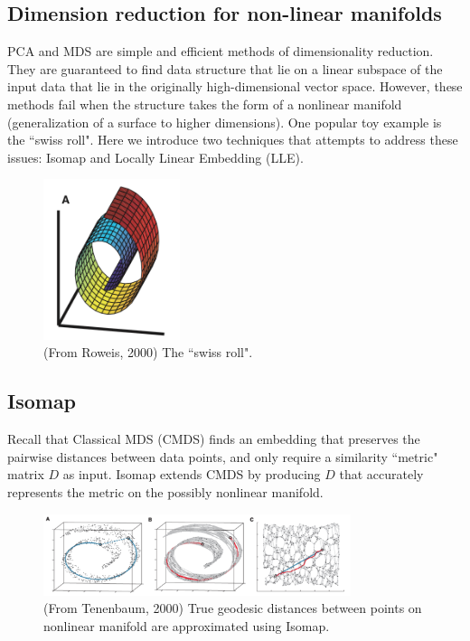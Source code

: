 \documentclass[11pt]{article}
\begin{document}
\begin{multicols}{2}
\section*{Dimension reduction for non-linear manifolds}
PCA and MDS are simple and efficient methods of dimensionality reduction. They are guaranteed to find data structure that lie on a linear subspace of the input data that lie in the originally high-dimensional vector space. However, these methods fail when the structure takes the form of a nonlinear manifold (generalization of a surface to higher dimensions). One popular toy example is the ``swiss roll". Here we introduce two techniques that attempts to address these issues: Isomap and Locally Linear Embedding (LLE).

\begin{figure}[H]
\centering
\includegraphics[width=4cm]{swissroll.png}
\caption{(From Roweis, 2000) The ``swiss roll".}
\end{figure}

\subsection*{Isomap}

Recall that Classical MDS (CMDS) finds an embedding that preserves the pairwise distances between data points, and only require a similarity ``metric" matrix $D$ as input. Isomap extends CMDS by producing $D$ that accurately represents the metric on the possibly nonlinear manifold. \\

\begin{figure}[H]
\centering
\includegraphics[width=9cm]{isomap.png}
\caption{(From Tenenbaum, 2000) True geodesic distances between points on nonlinear manifold are approximated using Isomap.}
\end{figure}


\end{multicols}
\end{document}
